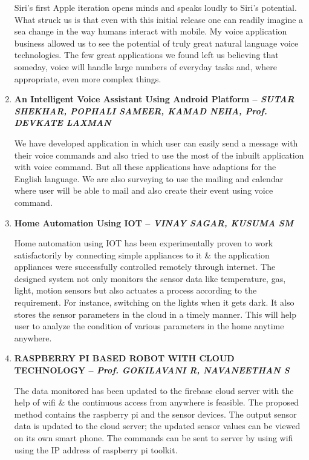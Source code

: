\documentclass[16pt,oneside,a4paper]{article}
\begin{document}
\begin{enumerate}
Siri's first Apple iteration opens minds and speaks loudly to Siri's potential. What struck us is that even with this initial release one can readily imagine a sea change in the way humans interact with mobile. My voice application business allowed us to see the potential of truly great natural language voice technologies. The few great applications we found left us believing that someday, voice will handle large numbers of everyday tasks and, where appropriate, even more complex things.\\

\item \textbf{An Intelligent Voice Assistant Using Android Platform -- \textit{SUTAR SHEKHAR, POPHALI SAMEER, KAMAD NEHA, Prof. DEVKATE LAXMAN}}

We have developed application in which user can easily send a message with their voice commands and also tried to use the most of the inbuilt application with voice command. But all these applications have adaptions for the English language. We are also surveying to use the mailing and calendar where user will be able to mail and also create their event using voice command.\\

\item \textbf{Home Automation Using IOT  -- \textit{VINAY SAGAR, KUSUMA SM}}

Home automation using IOT has been experimentally proven to work satisfactorily by connecting simple appliances to it \& the application appliances were successfully controlled remotely through internet. The designed system not only monitors the sensor data like temperature, gas, light, motion sensors but also actuates a process according to the requirement. For instance, switching on the lights when it gets dark. It also stores the sensor parameters in the cloud in a timely manner. This will help user to analyze the condition of various parameters in the home anytime anywhere.\\

\item \textbf{RASPBERRY PI BASED ROBOT WITH CLOUD TECHNOLOGY -- \textit{ Prof. GOKILAVANI R, NAVANEETHAN S}}

The data monitored has been updated to the firebase cloud server with the help of wifi \& the continuous access from anywhere is feasible. The proposed method contains the raspberry pi and the sensor devices. The output sensor data is updated to the cloud server; the updated sensor values can be viewed on its own smart phone. The commands can be sent to server by using wifi using the IP address of raspberry pi toolkit. \\



\end{enumerate}
\end{document}
